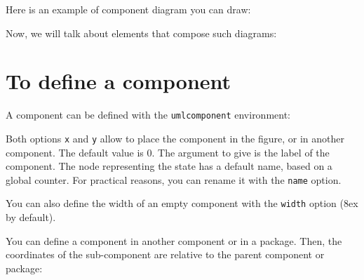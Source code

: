 \documentclass[a4paper,11pt]{report}
\begin{document}
Here is an example of component diagram you can draw:

\begin{center}
\end{center}

Now, we will talk about elements that compose such diagrams:

\section{To define a component}


A component can be defined with the {\tt umlcomponent} environment:  

\medskip

\begin{minipage}{0.51\textwidth}

\end{minipage}
\begin{minipage}{0.49\textwidth}
\begin{center}
\end{center}
\end{minipage}

\medskip

Both options {\tt x} and {\tt y} allow to place the component in the figure, or in another component. The default value is 0. 
The argument to give is the label of the component. The node representing the state has a default name, based on a global counter. For practical reasons, you can rename it with the {\tt name} option.

\medskip

You can also define the width of an empty component with the {\tt width} option (8ex by default).

\medskip

You can define a component in another component or in a package. Then, the coordinates of the sub-component are relative to the parent component or package:

\medskip

\begin{minipage}{0.51\textwidth}

\end{minipage}
\begin{minipage}{0.49\textwidth}
\begin{center}
\end{center}
\end{minipage}
\end{document}
